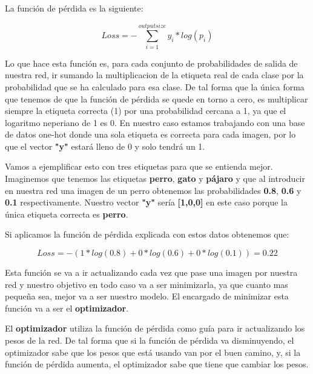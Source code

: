 La función de pérdida es la siguiente:

\[Loss = - \sum_{i=1}^{output size}y_i * log (p_i) \]

Lo que hace esta función es, para cada conjunto de probabilidades de salida de nuestra red, ir sumando la multiplicacion de la etiqueta real de cada clase por la probabilidad que se ha calculado para esa clase. De tal forma que la única forma que tenemos de que la función de pérdida se quede en torno a cero, es multiplicar siempre la etiqueta correcta (1) por una probabilidad cercana a 1, ya que el logaritmo neperiano de 1 es 0. En nuestro caso estamos trabajando con una base de datos one-hot donde una sola etiqueta es correcta para cada imagen, por lo que el vector \textbf{"y"} estará lleno de 0 y solo tendrá un 1.

\vspace{2 mm}

Vamos a ejemplificar esto con tres etiquetas para que se entienda mejor. Imaginemos que tenemos las etiquetas \textbf{perro}, \textbf{gato} y \textbf{pájaro} y que al introducir en nuestra red una imagen de un perro obtenemos las probabilidades \textbf{0.8}, \textbf{0.6} y \textbf{0.1} respectivamente. Nuestro vector \textbf{"y"} sería \textbf{[1,0,0]} en este caso porque la única etiqueta correcta es \textbf{perro}.

\vspace{2 mm}

Si aplicamos la función de pérdida explicada con estos datos obtenemos que:

\[Loss = - (1*log(0.8) + 0*log(0.6) + 0*log(0.1)) = 0.22\]


\vspace{2 mm}

Esta función se va a ir actualizando cada vez que pase una imagen por nuestra red y nuestro objetivo en todo caso va a ser minimizarla, ya que cuanto mas pequeña sea, mejor va a ser nuestro modelo. El encargado de minimizar esta función va a ser el \textbf{optimizador}.

\vspace{5 mm}

El \textbf{optimizador} utiliza la función de pérdida como guía para ir actualizando los pesos de la red. De tal forma que si la función de pérdida va disminuyendo, el optimizador sabe que los pesos que está usando van por el buen camino, y, si la función de pérdida aumenta, el optimizador sabe que tiene que cambiar los pesos.

\vspace{2 mm}

